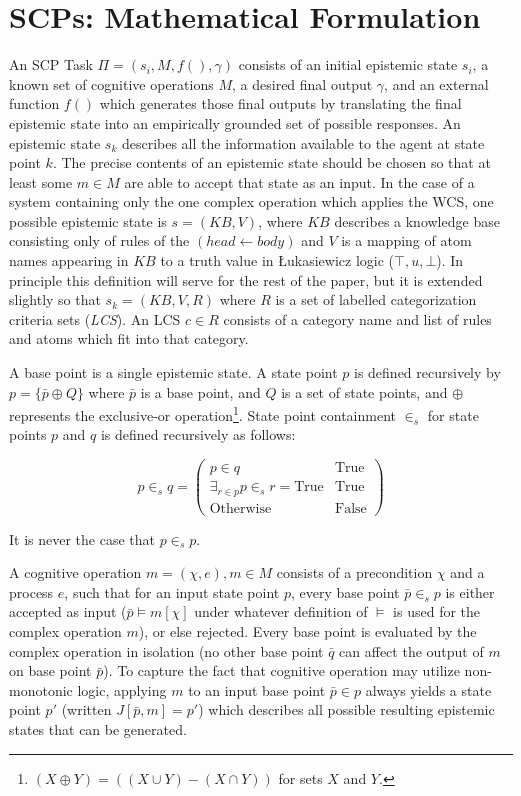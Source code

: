 \section{SCPs: Mathematical Formulation}
An SCP Task $\Pi=(s_i, M, f(), \gamma)$ consists of an initial epistemic state $s_i$, a known set of cognitive operations $M$, a desired final output $\gamma$, and an external function $f()$ which generates those final outputs by translating the final epistemic state into an empirically grounded set of possible responses. An epistemic state $s_k$ describes all the information available to the agent at state point $k$. The precise contents of an epistemic state should be chosen so that at least some $m \in M$ are able to accept that state as an input. In the case of a system containing only the one complex operation which applies the WCS, one possible epistemic state is $s=(KB,V)$, where $KB$ describes a knowledge base consisting only of rules of the $(head \leftarrow body)$ and $V$ is a mapping of atom names appearing in $KB$ to a truth value in \L ukasiewicz logic ($\top,u, \bot$). In principle this definition will serve for the rest of the paper, but it is extended slightly so that $s_k = (KB,V,R)$ where $R$ is a set of labelled categorization criteria sets (\textit{LCS}). An LCS $ c \in R$ consists of a category name and list of rules and atoms which fit into that category.

A base point is a single epistemic state. A state point $p$ is defined recursively by $p=\{\bar{p} \oplus Q \}$ where $\bar{p}$ is a base point, and $Q$ is a set of state points, and $\oplus$ represents the exclusive-or operation\footnote{$(X \oplus Y) = ((X \cup Y) - (X \cap Y))$ for sets $X$ and $Y$.}. State point containment $\in_s$ for state points $p$ and $q$ is defined recursively as follows:

\[
p \in_s q = \begin{pmatrix} p \in q  & \textrm{True} \\   \exists_{r\in p}p \in_s r = \textrm{True} & \textrm{True}   \\ \textrm{Otherwise} & \textrm{False} \end{pmatrix}
\]

It is never the case that $p \in_s p$.

A cognitive operation $m = (\chi, e), m \in M$ consists of a precondition $\chi$ and a process $e$, such that for an input state point $p$, every base point $\bar{p} \in_s p$ is either accepted as input ($\bar{p} \models m[\chi]$ under whatever definition of $\models$ is used for the complex operation $m$), or else rejected. Every base point is evaluated by the complex operation in isolation (no other base point $\bar{q}$ can affect the output of $m$ on base point $\bar{p}$). To capture the fact that cognitive operation may utilize non-monotonic logic, applying $m$ to an input base point $\bar{p}\in p$ always yields a state point $p'$ (written $J[\bar{p},m]=p'$) which describes all possible resulting epistemic states that can be generated. 

